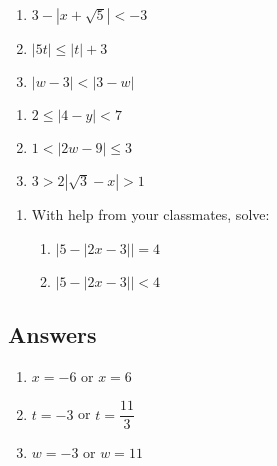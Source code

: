 \documentclass{ximera}
\begin{document}
\begin{multicols}{3}
\begin{enumerate}
\setcounter{enumi}{\value{HW}}


\item $3 - |x+\sqrt{5}| < -3$
\item $|5t| \leq |t|+3$   
\item $|w-3| < |3-w|$

\setcounter{HW}{\value{enumi}}
\end{enumerate}
\end{multicols}

\begin{multicols}{3}
\begin{enumerate}
\setcounter{enumi}{\value{HW}}

\item  $2 \leq |4-y| < 7$ 
\item $1 < |2w - 9| \leq 3$ 
\item  $3 > 2|\sqrt{3} - x| > 1$ \label{solveinequabsquadlast}
\setcounter{HW}{\value{enumi}}
\end{enumerate}
\end{multicols}

\begin{enumerate}
\setcounter{enumi}{\value{HW}}
\item  With help from your classmates, solve:
\begin{enumerate}
\item  $|5 - |2x-3|| = 4$
\item   $|5 - |2x-3|| < 4$
 
\end{enumerate}

\end{enumerate}


\newpage

\subsection{Answers}

\begin{multicols}{3}
\begin{enumerate}

\item  $x = -6$ or $x=6$ 

\item $t = -3$ or $t= \dfrac{11}{3}$

\item $w = -3$ or $w= 11$ 

\setcounter{HW}{\value{enumi}}
\end{enumerate}
\end{multicols}
\end{document}
